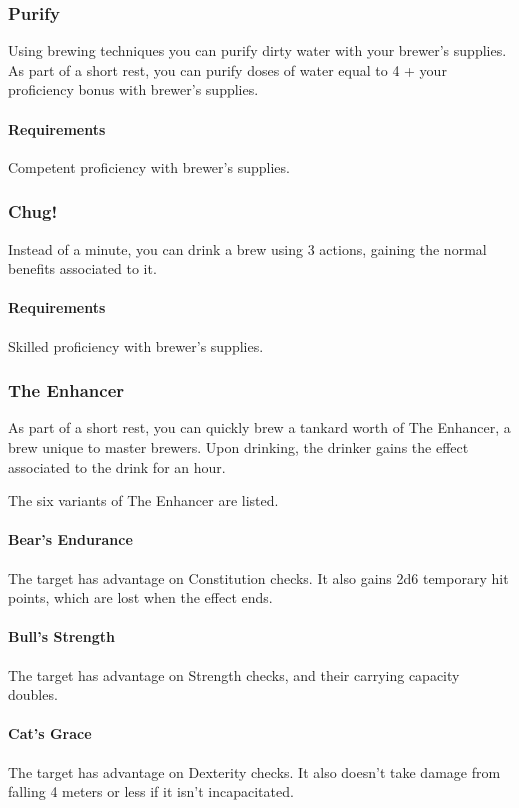 \subsubsection{Purify} \label{feat::purify}
    Using brewing techniques you can purify dirty water with your brewer's supplies.
    As part of a short rest, you can purify doses of water equal to 4 + your proficiency bonus with brewer's supplies.
    \paragraph{Requirements} Competent proficiency with brewer's supplies.
\subsubsection{Chug!} \label{feat::chug}
    Instead of a minute, you can drink a brew using 3 actions, gaining the normal benefits associated to it.
    \paragraph{Requirements} Skilled proficiency with brewer's supplies.
\subsubsection{The Enhancer} \label{feat::theenhancer}
    As part of a short rest, you can quickly brew a tankard worth of The Enhancer, a brew unique to master brewers.
    Upon drinking, the drinker gains the effect associated to the drink for an hour.

    The six variants of The Enhancer are listed.
    \paragraph{Bear's Endurance} The target has advantage on Constitution checks.
    It also gains 2d6 temporary hit points, which are lost when the effect ends.
    \paragraph{Bull's Strength} The target has advantage on Strength checks, and their carrying capacity doubles.
    \paragraph{Cat's Grace} The target has advantage on Dexterity checks.
    It also doesn't take damage from falling 4 meters or less if it isn't incapacitated.
